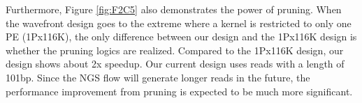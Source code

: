 Furthermore, Figure \ref{fig:F2C5} also demonstrates the power of pruning. 
When the wavefront design goes to the extreme where a kernel is restricted to only one PE (1Px116K), 
the only difference between our design and the 1Px116K design is whether the pruning logics are realized. 
Compared to the 1Px116K design, our design shows about 2x speedup.
Our current design uses reads with a length of 101bp.
Since the NGS flow will generate longer reads in the future, the performance improvement from pruning is expected to be much more significant.

